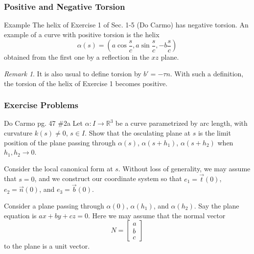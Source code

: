 \documentclass[handout]{beamer}
\theoremstyle{definition}
\theoremstyle{remark}
\newtheorem{remark}{Remark}
\newcommand{\R}{\mathbb{R}}
\renewcommand{\=}{&=&}
\newcommand{\<}{\langle}
\renewcommand{\>}{\rangle}
\newcommand{\bmat}{\begin{bmatrix}}
\newcommand{\emat}{\end{bmatrix}}
\begin{document}
\begin{frame}[t]
\frametitle{Positive and Negative Torsion}
\begin{block}{Example}
The helix of Exercise 1 of Sec. 1-5 (Do Carmo) has negative torsion. An example of a curve with
positive torsion is the helix
\[
\alpha(s) = \left( a \cos \frac{s}{c}, a \sin \frac{s}{c}, -b\frac{s}{c}\right)
\]
obtained from the first one by a reflection in the $xz$ plane.
\end{block}
\pause
\begin{remark}
It is also usual to define torsion by $b' = - \tau n$. With such a definition, the torsion of the helix
of Exercise 1 becomes positive.
\end{remark}
\end{frame}

\begin{frame}[t]
\frametitle{Exercise Problems}
\begin{block}{Do Carmo pg. 47 \#2a}
Let $\alpha : I \to \R^3$ be a curve parametrized by arc length, with curvature $k(s) \ne 0$,
$s \in I$. Show that the osculating plane at $s$ is the limit position of the plane passing through
$\alpha(s)$, $\alpha(s+h_1)$, $\alpha(s+h_2)$ when $h_1, h_2 \to 0$.
\end{block}
\pause
\begin{solution}
Consider the local canonical form at $s$. Without loss of generality, we may assume that $s = 0$,
and we construct our coordinate system so that $e_1 = \vec t(0)$, $e_2 = \vec n(0)$, and $e_3 = 
\vec b(0)$.

\pause
\vspace{3mm}

Consider a plane passing through $\alpha(0)$, $\alpha(h_1)$, and $\alpha(h_2)$. 
Say the plane equation is $ax + by + cz = 0$. Here we may assume that the normal vector 
$$N = \bmat a \\ b \\ c \emat$$ 
to the plane is a unit vector.
\end{solution}
\end{frame}
\end{document}
